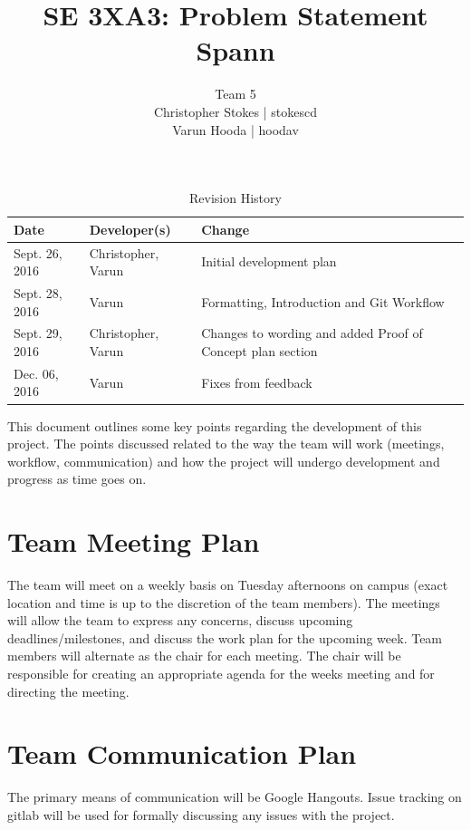 \documentclass{article}
\title{SE 3XA3: Problem Statement\\Spann}
\author{Team 5
		\\ Christopher Stokes | stokescd
		\\ Varun Hooda | hoodav
}
\date{}
\begin{document}
\begin{table}[hp]
\caption{Revision History} \label{TblRevisionHistory}
\begin{tabularx}{\textwidth}{llX}
\toprule
\textbf{Date} & \textbf{Developer(s)} & \textbf{Change}\\
\midrule
    Sept. 26, 2016 & Christopher, Varun & Initial development plan\\
    Sept. 28, 2016 & Varun & Formatting, Introduction and Git Workflow\\
    Sept. 29, 2016 & Christopher, Varun & Changes to wording and added Proof of
    Concept plan section\\
    Dec. 06, 2016 & Varun & Fixes from feedback\\
\bottomrule
\end{tabularx}
\end{table}

\newpage

\maketitle

This document outlines some key points regarding the development of this
project. The points discussed related to the way the team will work (meetings,
workflow, communication) and how the project will undergo development and
progress as time goes on.

\section{Team Meeting Plan}
The team will meet on a weekly basis on Tuesday afternoons on campus (exact
location and time is up to the discretion of the team members). The meetings
will allow the team to express any concerns, discuss upcoming
deadlines/milestones, and discuss the work plan for the upcoming week. Team
members will alternate as the chair for each meeting. The chair will be
responsible for creating an appropriate agenda for the weeks meeting and for
directing the meeting.

\section{Team Communication Plan}
The primary means of communication will be Google Hangouts. Issue tracking on
gitlab will be used for formally discussing any issues with the project.
\end{document}
